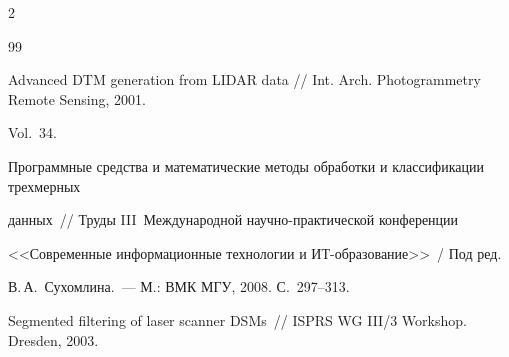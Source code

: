 \begin{multicols}{2}
{{\begin{thebibliography}{99}

Advanced DTM generation from \mbox{LIDAR} data // Int. Arch. Photogrammetry Remote Sensing, 2001. 

Vol.~34.





Программные средства и мате\-матические методы обработки и классификации трех\-мерных 

данных~// Труды III~Международной научно-прак\-ти\-че\-ской конференции 

<<Современные информационные технологии и ИТ-образование>>~/ Под ред.\ 

В.\,А.~Сухомлина.~--- М.: ВМК МГУ, 2008. С.~297--313.



\label{end\stat}





Segmented filtering of laser scanner DSMs~// ISPRS WG III/3 Workshop. Dresden, 2003.

 \end{thebibliography}

}

}

\end{multicols}

